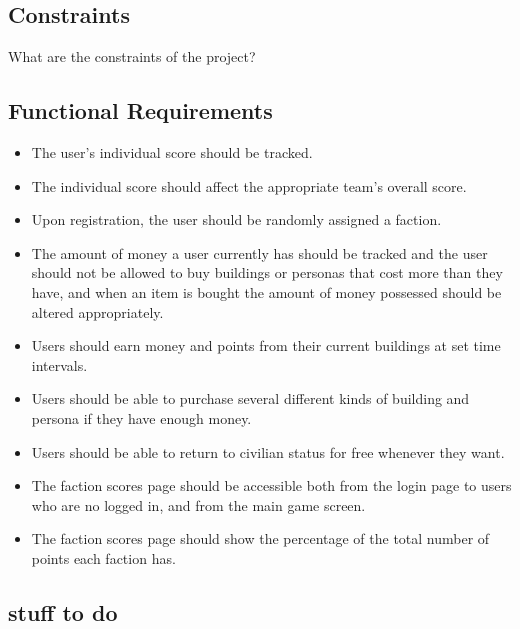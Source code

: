 \documentclass{sig-alt-release2}
\begin{document}
\subsection{Constraints}

What are the constraints of the project?\\

\subsection{Functional Requirements}

\begin{itemize}

\item The user's individual score should be tracked.

\item The individual score should affect the appropriate team's overall score.

\item Upon registration, the user should be randomly assigned a faction.

\item The amount of money a user currently has should be tracked and the user should not be allowed to buy buildings or personas that cost more than they have, and when an item is bought the amount of money possessed should be altered appropriately.

\item Users should earn money and points from their current buildings at set time intervals.

\item Users should be able to purchase several different kinds of building and persona if they have enough money.

\item Users should be able to return to civilian status for free whenever they want.

\item The faction scores page should be accessible both from the login page to users who are no logged in, and from the main game screen.

\item The faction scores page should show the percentage of the total number of points each faction has.

\end{itemize}

\subsection{stuff to do} 
\end{document}
